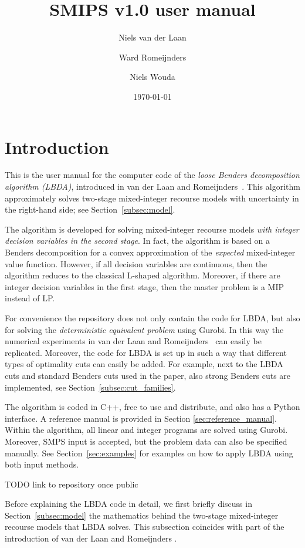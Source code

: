 \documentclass[12pt, english]{article}
\title{SMIPS v1.0 user manual}
\author{
	Niels van der Laan
	\and
	Ward Romeijnders
	\and
	Niels Wouda
}
\date{\today}
\begin{document}
	
\maketitle
\tableofcontents

\clearpage

\section{Introduction}
\label{sec:introduction}
This is the user manual for the computer code of the \emph{loose Benders decomposition algorithm (LBDA)}, introduced in van der Laan and Romeijnders~\cite{vanderLaan2020}. This algorithm approximately solves two-stage mixed-integer recourse models with uncertainty in the right-hand side; see Section~\ref{subsec:model}. 

The algorithm is developed for solving mixed-integer recourse models \emph{with integer decision variables in the second stage}. In fact, the algorithm is based on a Benders decomposition for a convex approximation of the \emph{expected} mixed-integer value function. However, if all decision variables are continuous, then the algorithm reduces to the classical L-shaped algorithm. Moreover, if there are integer decision variables in the first stage, then the master problem is a MIP instead of LP.

For convenience the repository does not only contain the code for LBDA, but also for solving the \emph{deterministic equivalent problem} using Gurobi. In this way the numerical experiments in van der Laan and Romeijnders~\cite{vanderLaan2020} can easily be replicated. Moreover, the code for LBDA is set up in such a way that different types of optimality cuts can easily be added. For example, next to the LBDA cuts and standard Benders cuts used in the paper, also strong Benders cuts are implemented, see Section~\ref{subsec:cut_families}.

The algorithm is coded in C++, free to use and distribute, and also has a Python interface. A reference manual is provided in Section \ref{sec:reference_manual}. Within the algorithm, all linear and integer programs are solved using Gurobi. Moreover, SMPS input is accepted, but the problem data can also be specified manually. See Section~\ref{sec:examples} for examples on how to apply LBDA using both input methods. 

TODO link to repository once public

Before explaining the LBDA code in detail, we first briefly discuss in Section~\ref{subsec:model} the mathematics behind the two-stage mixed-integer recourse models that LBDA solves. This subsection coincides with part of the introduction of van der Laan and Romeijnders \cite{vanderLaan2020}.
\end{document}
